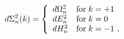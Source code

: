 \begin{equation} \label{little}
d\Sigma^2_{n}(k) =\left\{
\begin{array}{ll}
d\Omega^2_{n}& {\rm for}\; k = +1\\
dE_n^2& {\rm for}\; k = 0 \\
d H^2_{n} &{\rm for}\; k = -1\ ,
\end{array} \right.
\end{equation}

